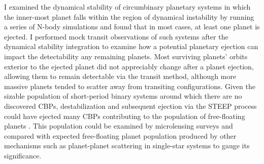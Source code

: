 
I examined the dynamical stability of circumbinary planetary systems in which the inner-most planet falls within the region of dynamical instability by running a series of N-body simulations and found that in most cases, at least one planet is ejected.  I performed mock transit observations of such systems after the dynamical stability integration to examine how a potential planetary ejection can impact the detectability any remaining planets.  Most surviving planets' orbits exterior to the ejected planet did not appreciably change after a planet ejection, allowing them to remain detectable via the transit method, although more massive planets tended to scatter away from transiting configurations.  Given the sizable population of short-period binary systems \citep{Kirk2016} around which there are no discovered CBPs, destabilization and subsequent ejection via the STEEP process could have ejected many CBPs contributing to the population of free-floating planets \citep{Veras2012}.  This population could be examined by microlensing surveys \citep[e.g.][]{Sumi2011} and compared with expected free-floating planet population produced by other mechanisms such as planet-planet scattering in single-star systems to gauge its significance.

